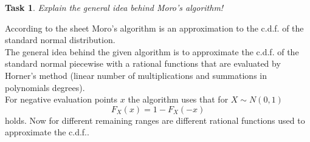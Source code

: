 \documentclass{scrartcl}
\newtheorem{task}{Task}
\begin{document}
	\begin{task}
		Explain the general idea behind Moro’s algorithm!
	\end{task}
	According to the sheet Moro's algorithm is an approximation to the c.d.f. of the standard normal distribution. \\
	The general idea behind the given algorithm is to approximate the c.d.f. of the standard normal piecewise with a rational functions that are evaluated by Horner's method (linear number of multiplications and summations in polynomials degrees). \\
	For negative evaluation points $x$ the algorithm uses that for $X\sim N(0,1)$ 
	\begin{equation}
		F_X(x) = 1 - F_X(-x)
	\end{equation}
	holds.
	Now for different remaining ranges are different rational functions used to approximate the c.d.f.. 
\end{document}

